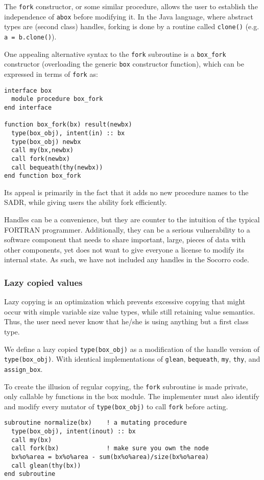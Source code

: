 The \verb+fork+ constructor, or some similar procedure, allows the
user to establish the independence of \verb+abox+ before modifying it.
In the Java language, where abstract types are (second class) handles,
forking is done by a routine called \verb+clone()+ (e.g. 
\verb+a = b.clone()+).

One appealing alternative syntax to the \verb+fork+ subroutine is
a \verb+box_fork+ constructor (overloading the generic \verb+box+
constructor function), which can be expressed in terms of \verb+fork+
as:
\begin{verbatim}
interface box
  module procedure box_fork
end interface

function box_fork(bx) result(newbx)
  type(box_obj), intent(in) :: bx
  type(box_obj) newbx
  call my(bx,newbx)
  call fork(newbx)
  call bequeath(thy(newbx))
end function box_fork
\end{verbatim}
Its appeal is primarily in the fact that it adds no new procedure names
to the SADR, while giving users the ability fork efficiently.

Handles can be a convenience, but they are counter to
the intuition of the typical FORTRAN programmer.  Additionally, they
can be a serious vulnerability to a software component that needs to
share important, large, pieces of data with other components, yet does
not want to give everyone a license to modify its internal state.
As such, we have not included any handles in the Socorro code.


\subsubsection{Lazy copied values}

\label{lazysec}

Lazy copying is an optimization which prevents excessive copying
that might occur with simple variable size value types, while
still retaining value semantics.  Thus, the user need never
know that he/she is using anything but a first class type.

We define a lazy copied \verb+type(box_obj)+ as a modification of
the handle version of \verb+type(box_obj)+.
With identical implementations of 
\verb+glean+, \verb+bequeath+, \verb+my+, \verb+thy+, and
\verb+assign_box+.  

To create the illusion of regular copying,
the \verb+fork+ subroutine is made private, only callable by functions
in the box module.  The implementer must also identify and modify
every mutator of \verb+type(box_obj)+ to call \verb+fork+ before acting.
\begin{verbatim}
subroutine normalize(bx)    ! a mutating procedure
  type(box_obj), intent(inout) :: bx
  call my(bx)
  call fork(bx)             ! make sure you own the node
  bx%o%area = bx%o%area - sum(bx%o%area)/size(bx%o%area)
  call glean(thy(bx))
end subroutine
\end{verbatim}


